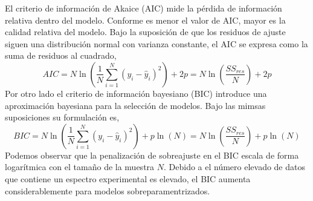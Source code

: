 El criterio de información de Akaice (AIC) mide la pérdida de información relativa dentro del modelo. Conforme es menor el valor de AIC, mayor es la calidad relativa del modelo. Bajo la suposición de que los residuos de ajuste siguen una distribución normal con varianza constante, el AIC se expresa como la suma de residuos al cuadrado,
\begin{equation}
    AIC = N \ln\left( \frac{1}{N}\sum_{i=1}^N (y_i - \hat{y}_i)^2\right) + 2p = N \ln\left( \frac{SS_{res}}{N}
    \right) + 2p 
\end{equation}
Por otro lado el criterio de información bayesiano (BIC) introduce una aproximación bayesiana para la selección de modelos. Bajo las mimsas suposiciones su formulación es,
\begin{equation}
    BIC = N \ln \left( \frac{1}{N}\sum_{i=1}^N (y_i - \hat{y}_i)^2\right) + p \ln(N) = N \ln\left( \frac{SS_{res}}{N}
    \right) + p \ln(N)
\end{equation}
Podemos observar que la penalización de sobreajuste en el BIC escala de forma logarítmica con el tamaño de la muestra $N$. Debido a el número elevado de datos que contiene un espectro experimental es elevado, el BIC aumenta considerablemente para modelos sobreparamentrizados.
